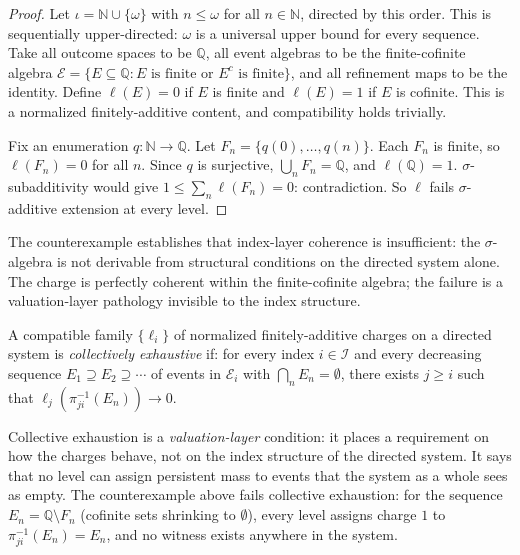 \begin{proof}
Let $\iota = \mathbb{N} \cup \{\omega\}$ with $n \leq \omega$ for all $n \in \mathbb{N}$,
directed by this order.  This is sequentially upper-directed: $\omega$ is a universal
upper bound for every sequence.  Take all outcome spaces to be $\mathbb{Q}$, all event
algebras to be the finite-cofinite algebra $\mathcal{E} = \{E \subseteq \mathbb{Q} :
E \text{ is finite or } E^c \text{ is finite}\}$, and all refinement maps to be the
identity.  Define $\ell(E) = 0$ if $E$ is finite and $\ell(E) = 1$ if $E$ is cofinite.
This is a normalized finitely-additive content, and compatibility holds trivially.

Fix an enumeration $q : \mathbb{N} \to \mathbb{Q}$.  Let $F_n = \{q(0), \ldots, q(n)\}$.
Each $F_n$ is finite, so $\ell(F_n) = 0$ for all $n$.  Since $q$ is surjective,
$\bigcup_n F_n = \mathbb{Q}$, and $\ell(\mathbb{Q}) = 1$.  $\sigma$-subadditivity
would give $1 \leq \sum_n \ell(F_n) = 0$: contradiction.  So $\ell$ fails
$\sigma$-additive extension at every level.
\end{proof}

\noindent The counterexample establishes that index-layer coherence is insufficient:
the $\sigma$-algebra is not derivable from structural conditions on the directed system
alone.  The charge is perfectly coherent within the finite-cofinite algebra; the
failure is a valuation-layer pathology invisible to the index structure.

\begin{definition}
\label{def:collective-exhaustion}
A compatible family $\{\ell_i\}$ of normalized finitely-additive charges on a directed
system is \emph{collectively exhaustive} if: for every index $i \in \mathcal{I}$ and
every decreasing sequence $E_1 \supseteq E_2 \supseteq \cdots$ of events in
$\mathcal{E}_i$ with $\bigcap_n E_n = \emptyset$, there exists $j \geq i$ such that
$\ell_j(\pi_{ji}^{-1}(E_n)) \to 0$.
\end{definition}

\noindent Collective exhaustion is a \emph{valuation-layer} condition: it places a
requirement on how the charges behave, not on the index structure of the directed system.
It says that no level can assign persistent mass to events that the system as a whole
sees as empty.  The counterexample above fails collective exhaustion: for the sequence
$E_n = \mathbb{Q} \setminus F_n$ (cofinite sets shrinking to $\emptyset$), every level
assigns charge $1$ to $\pi_{ji}^{-1}(E_n) = E_n$, and no witness exists anywhere in the
system.

